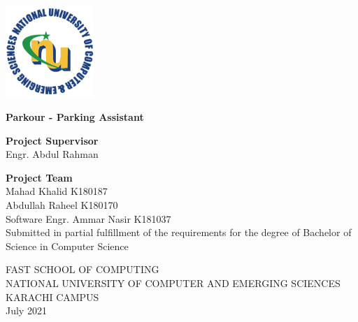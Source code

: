 \begin{titlepage}
    \begin{center}
        \vspace*{1cm}

        \includegraphics*[width=0.25\textwidth]{images/nu.png}


        \vspace{1cm}

        \Huge
        \textbf{Parkour - Parking Assistant}

        \vspace{1.0cm}
        \Large
        \textbf{Project Supervisor}\\
        \vspace{0.2cm}
        Engr. Abdul Rahman

        \vspace{1cm}
        \Large
        \textbf{Project Team}\\
        \vspace{0.2cm}
        \large
        Mahad Khalid K180187\\
        Abdullah Raheel K180170\\
        Software Engr. Ammar Nasir K181037\\
        \vspace{0.5cm}
        \small
        Submitted in partial fulfillment of the requirements for the degree of Bachelor of Science in
        Computer Science


        \vfill
        \normalsize
        FAST SCHOOL OF COMPUTING\\
        NATIONAL UNIVERSITY OF COMPUTER AND EMERGING SCIENCES\\
        KARACHI CAMPUS\\
        July 2021

    \end{center}
\end{titlepage}